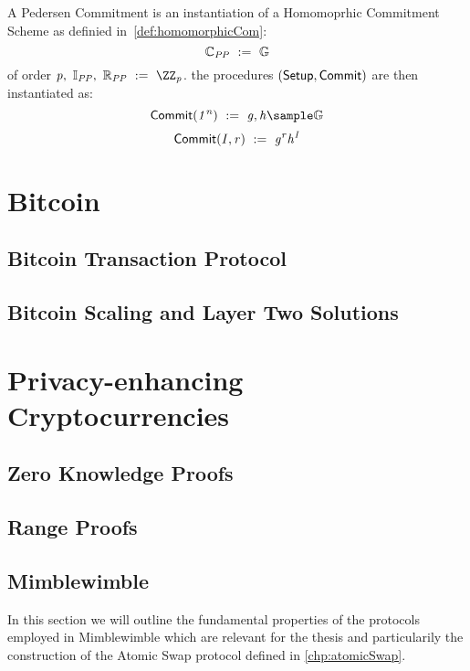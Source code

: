 \begin{definition}\label{def:pedersenCom}
    A Pedersen Commitment is an instantiation of a Homomoprhic Commitment Scheme as definied in~\ref{def:homomorphicCom}:
    \[ \mathbb{C}_{\mathit{PP}} ~:=~ \mathbb{G}\] of order $\varPrime \opSeperate \varInputSpace_{\varPublicParam} \opSeperate \varRandSpace_{\varPublicParam} \opAssign \cnstIntegersPrime{\varPrime}$.
    the procedures $(\mathsf{Setup}, \mathsf{Commit})$ are then instantiated as:
    \[ \procSetup{\varSecParam} \opAssign \varG, \varH \sample \cnstGroup\]
    \[ \mathsf{Commit}(\mathit{I}, \mathit{r}) ~:=~ \mathit{g}^{\mathit{r}} \mathit{h}^{\mathit{I}} \]

\end{definition}


\section{Bitcoin}\label{sec:bitcoin}

\subsection{Bitcoin Transaction Protocol}\label{sec:bitcoinTx}

\subsection{Bitcoin Scaling and Layer Two Solutions}\label{sec:bitcoinScaling}


\section{Privacy-enhancing Cryptocurrencies}\label{sec:privacyCryptos}

\subsection{Zero Knowledge Proofs}\label{sec:zeroKnowlegde}

\subsection{Range Proofs}\label{sec:rangeProof}

\subsection{Mimblewimble}\label{sec:Mimblewimble}
In this section we will outline the fundamental properties of the protocols employed in Mimblewimble which are relevant for the thesis and particularily the construction of the Atomic Swap protocol defined in
\ref{chp:atomicSwap}.
